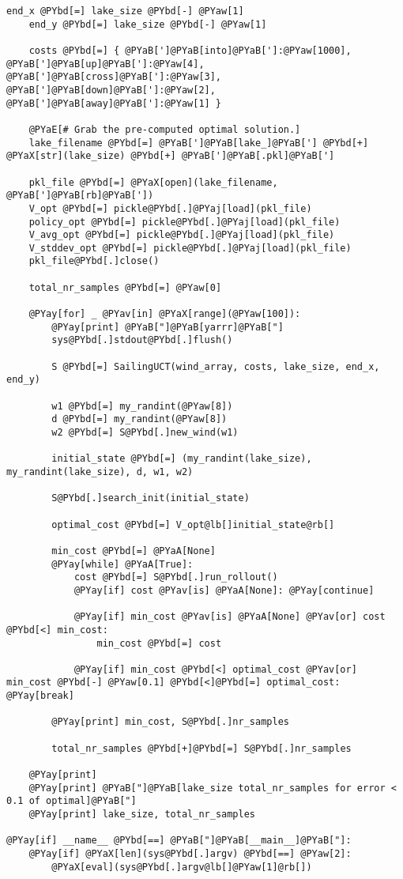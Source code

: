 \begin{Verbatim}[commandchars=@\[\]]
    end_x @PYbd[=] lake_size @PYbd[-] @PYaw[1]
    end_y @PYbd[=] lake_size @PYbd[-] @PYaw[1]

    costs @PYbd[=] { @PYaB[']@PYaB[into]@PYaB[']:@PYaw[1000], @PYaB[']@PYaB[up]@PYaB[']:@PYaw[4], @PYaB[']@PYaB[cross]@PYaB[']:@PYaw[3], @PYaB[']@PYaB[down]@PYaB[']:@PYaw[2], @PYaB[']@PYaB[away]@PYaB[']:@PYaw[1] }

    @PYaE[# Grab the pre-computed optimal solution.]
    lake_filename @PYbd[=] @PYaB[']@PYaB[lake_]@PYaB['] @PYbd[+] @PYaX[str](lake_size) @PYbd[+] @PYaB[']@PYaB[.pkl]@PYaB[']

    pkl_file @PYbd[=] @PYaX[open](lake_filename, @PYaB[']@PYaB[rb]@PYaB['])
    V_opt @PYbd[=] pickle@PYbd[.]@PYaj[load](pkl_file)
    policy_opt @PYbd[=] pickle@PYbd[.]@PYaj[load](pkl_file)
    V_avg_opt @PYbd[=] pickle@PYbd[.]@PYaj[load](pkl_file)
    V_stddev_opt @PYbd[=] pickle@PYbd[.]@PYaj[load](pkl_file)
    pkl_file@PYbd[.]close()

    total_nr_samples @PYbd[=] @PYaw[0]

    @PYay[for] _ @PYav[in] @PYaX[range](@PYaw[100]):
        @PYay[print] @PYaB["]@PYaB[yarrr]@PYaB["]
        sys@PYbd[.]stdout@PYbd[.]flush()

        S @PYbd[=] SailingUCT(wind_array, costs, lake_size, end_x, end_y)

        w1 @PYbd[=] my_randint(@PYaw[8])
        d @PYbd[=] my_randint(@PYaw[8])
        w2 @PYbd[=] S@PYbd[.]new_wind(w1)

        initial_state @PYbd[=] (my_randint(lake_size), my_randint(lake_size), d, w1, w2)

        S@PYbd[.]search_init(initial_state)

        optimal_cost @PYbd[=] V_opt@lb[]initial_state@rb[]

        min_cost @PYbd[=] @PYaA[None]
        @PYay[while] @PYaA[True]:
            cost @PYbd[=] S@PYbd[.]run_rollout()
            @PYay[if] cost @PYav[is] @PYaA[None]: @PYay[continue]

            @PYay[if] min_cost @PYav[is] @PYaA[None] @PYav[or] cost @PYbd[<] min_cost:
                min_cost @PYbd[=] cost

            @PYay[if] min_cost @PYbd[<] optimal_cost @PYav[or] min_cost @PYbd[-] @PYaw[0.1] @PYbd[<]@PYbd[=] optimal_cost: @PYay[break]

        @PYay[print] min_cost, S@PYbd[.]nr_samples

        total_nr_samples @PYbd[+]@PYbd[=] S@PYbd[.]nr_samples

    @PYay[print]
    @PYay[print] @PYaB["]@PYaB[lake_size total_nr_samples for error < 0.1 of optimal]@PYaB["]
    @PYay[print] lake_size, total_nr_samples

@PYay[if] __name__ @PYbd[==] @PYaB["]@PYaB[__main__]@PYaB["]:
    @PYay[if] @PYaX[len](sys@PYbd[.]argv) @PYbd[==] @PYaw[2]:
        @PYaX[eval](sys@PYbd[.]argv@lb[]@PYaw[1]@rb[])
\end{Verbatim}
